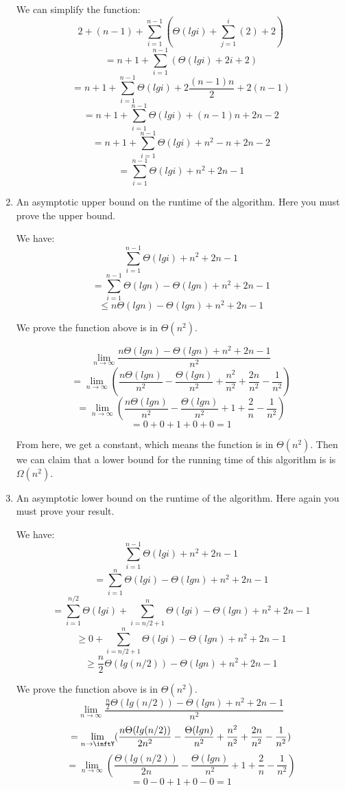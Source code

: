 \documentclass{cpsc413Solutions}
\begin{document}
\begin{problemlist}
\begin{problem}
\begin{answer}
\begin{enumerate}
    We can simplify the function:
    $$ 2 +(n-1) +  \sum_{i=1}^{n-1}(\Theta(lgi) + \sum_{j=1}^i(2)+2)$$
    $$= n+1 +  \sum_{i=1}^{n-1}(\Theta(lgi) + 2i+2)$$
    $$= n+1 + \sum_{i=1}^{n-1} \Theta(lgi) + 2 \frac{(n-1)n}{2}+ 2(n-1)$$
    $$= n+1 +\sum_{i=1}^{n-1}\Theta(lgi) + (n-1)n +2n-2$$
    $$= n+1 +\sum_{i=1}^{n-1}\Theta(lgi) + n^2-n +2n-2$$
    $$= \sum_{i=1}^{n-1}\Theta(lgi) + n^2+2n-1$$
    
    \item An asymptotic upper bound on the runtime of the algorithm. Here you must prove the upper bound.
    
      We have:
    $$\sum_{i=1}^{n-1}\Theta(lgi) + n^2+2n-1$$
    $$= \sum_{i=1}^{n-1}\Theta(lgn) - \Theta(lgn)+ n^2+2n-1$$
    $$ \leq n\Theta(lgn) -\Theta(lgn) + n^2+2n-1$$
    
    We prove the function above is in $\Theta(n^2)$.
    
    $$\lim_{n\to\infty} \frac{n\Theta(lgn) -\Theta(lgn) + n^2+2n-1}{n^2} $$
    $$= \lim_{n\to\infty }( \frac{n\Theta(lgn)}{n^2} -\frac{\Theta(lgn)}{n^2}+ \frac{n^2}{n^2} +\frac{2n}{n^2} - \frac{1}{n^2})$$
    $$= \lim_{n\to \infty} (\frac{n\Theta(lgn)}{n^2}-\frac{\Theta(lgn)}{n^2}+ 1 + \frac{2}{n} - \frac{1}{n^2})$$
    $$=0+0+1+0+0 = 1$$
    
    
   From here, we get a constant, which means the function is in $\Theta(n^2)$. Then we can claim that a lower bound for the running time of this algorithm is is $\Omega(n^2)$.
    
    \item An asymptotic lower bound on the runtime of the algorithm. Here again you must prove your result. 
        
    We have:
    $$\sum_{i=1}^{n-1}\Theta(lgi) + n^2+2n-1$$
    $$= \sum_{i=1}^{n}\Theta(lgi) - \Theta(lgn)+ n^2+2n-1$$
    $$ = \sum_{i=1}^{n/2}\Theta(lgi) +  \sum_{i=n/2+1}^{n}\Theta(lgi) -\Theta(lgn) + n^2+2n-1$$
    $$ \geq 0 + \sum_{i=n/2+1}^{n}\Theta(lgi) -\Theta(lgn) + n^2+2n-1$$
    $$ \geq \frac{n}{2}\Theta(lg(n/2)) -\Theta(lgn) + n^2+2n-1$$
    
    
    We prove the function above is in $\Theta(n^2)$.\\
    
    
    $$\lim_{n\to\infty} \frac{\frac{n}{2}\Theta(lg(n/2)) -\Theta(lgn) + n^2+2n-1}{n^2} $$
    $$= \lim_{n\to\inftY }( \frac{n\Theta(lg(n/2))}{2n^2} -\frac{\Theta(lgn)}{n^2}+ \frac{n^2}{n^2} +\frac{2n}{n^2} - \frac{1}{n^2})$$
    $$= \lim_{n\to \infty} (\frac{\Theta(lg(n/2))}{2n}-\frac{\Theta(lgn)}{n^2}+ 1 + \frac{2}{n}- \frac{1}{n^2})$$
    $$=0-0+1+0-0 = 1$$
    

\end{enumerate}
\end{answer}
\end{problem}
\end{problemlist}
\end{document}
